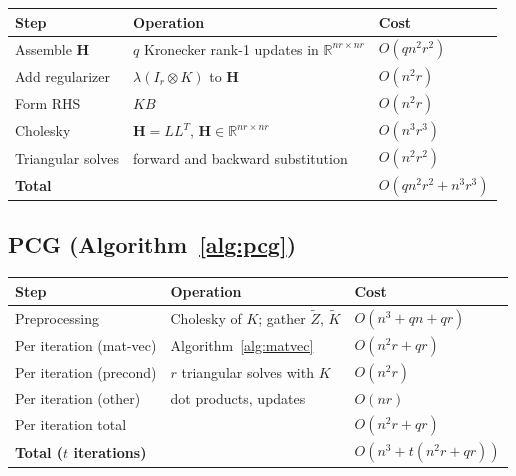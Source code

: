 \documentclass[12pt]{article}
\theoremstyle{definition}
\begin{document}
\begin{center}
\begin{tabular}{lll}
  \toprule
  Step & Operation & Cost \\
  \midrule
  Assemble $\mathbf{H}$ & $q$ Kronecker rank-1 updates in $\mathbb{R}^{nr \times nr}$ & $O(q n^2 r^2)$ \\
  Add regularizer & $\lambda(I_r \otimes K)$ to $\mathbf{H}$ & $O(n^2 r)$ \\
  Form RHS & $KB$ & $O(n^2 r)$ \\
  Cholesky & $\mathbf{H} = LL^T$, $\mathbf{H} \in \mathbb{R}^{nr \times nr}$ & $O(n^3 r^3)$ \\
  Triangular solves & forward and backward substitution & $O(n^2 r^2)$ \\
  \midrule
  \textbf{Total} & & $O(q n^2 r^2 + n^3 r^3)$ \\
  \bottomrule
\end{tabular}
\end{center}

\subsection{PCG (Algorithm~\ref{alg:pcg})}

\begin{center}
\begin{tabular}{lll}
  \toprule
  Step & Operation & Cost \\
  \midrule
  Preprocessing & Cholesky of $K$; gather $\widetilde{Z}$, $\widetilde{K}$ & $O(n^3 + qn + qr)$ \\
  Per iteration (mat-vec) & Algorithm~\ref{alg:matvec} & $O(n^2 r + qr)$ \\
  Per iteration (precond) & $r$ triangular solves with $K$ & $O(n^2 r)$ \\
  Per iteration (other) & dot products, updates & $O(nr)$ \\
  \midrule
  Per iteration total & & $O(n^2 r + qr)$ \\
  \midrule
  \textbf{Total ($t$ iterations)} & & $O(n^3 + t(n^2 r + qr))$ \\
  \bottomrule
\end{tabular}
\end{center}
\end{document}
